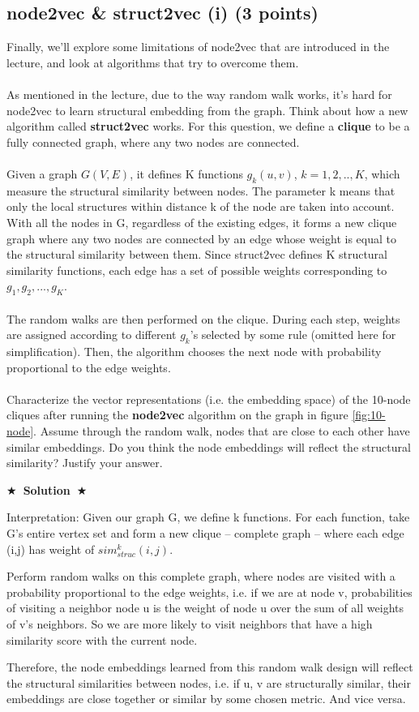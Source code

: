 \documentclass{article}
\numberwithin{figure}{section}
\newcommand{\Solution}[1]{{\medskip \color{red} \bf $\bigstar$~\sf \textbf{Solution}~$\bigstar$ \sf #1 } \bigskip}
\begin{document}
\subsection{node2vec \& struct2vec (i) (3 points)}
Finally, we’ll explore some limitations of node2vec that are introduced in the lecture, and look at algorithms that try to overcome them.\\
\\
As mentioned in the lecture, due to the way random walk works, it’s hard for node2vec to learn structural embedding from the graph. Think about how a new algorithm called \textbf{struct2vec} works. For this question, we define a \textbf{clique} to be a fully connected graph, where any two nodes are connected.\\
\\
Given a graph $G(V,E)$, it defines K functions $g_k(u,v)$, $k = 1,2,..,K$, which measure the structural similarity between nodes. The parameter k means that only the local structures within distance k of the node are taken into account.
With all the nodes in G, regardless of the existing edges, it forms a new clique graph where any two nodes are connected by an edge whose weight is equal to the structural similarity between them. Since struct2vec defines K structural similarity functions, each edge has a set of possible weights corresponding to $g_1, g_2,...,g_K$.\\
\\
The random walks are then performed on the clique. During each step, weights are assigned according to different $g_k$’s selected by some rule (omitted here for simplification). Then, the algorithm chooses the next node with probability proportional to the edge weights.\\
\\
Characterize the vector representations (i.e. the embedding space) of the 10-node cliques after running the \textbf{node2vec} algorithm on the graph in figure \ref{fig:10-node}. Assume through the random walk, nodes that are close to each other have similar embeddings. Do you think the node embeddings will reflect the structural similarity? Justify your answer.

\Solution{ 
  
Interpretation: Given our graph G, we define k functions. For each function, take G's entire vertex set and form a new clique -- complete graph -- where each edge (i,j) has weight of $sim_{struc}^{k}(i,j)$.


Perform random walks on this complete graph, where nodes are visited with a probability proportional to the edge weights, 
i.e. if we are at node v, probabilities of visiting a neighbor node u is the weight of node u over the sum of all weights of v's neighbors.
So we are more likely to visit neighbors that have a high similarity score with the current node.

Therefore, the node embeddings learned from this random walk design will reflect the structural similarities between nodes, 
i.e. if u, v are structurally similar, their embeddings are close together or similar by some chosen metric. And vice versa.}
\end{document}
